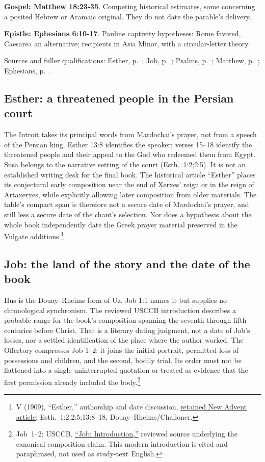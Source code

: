 \noindent\textbf{Gospel: Matthew 18:23-35}. Competing historical estimates, some concerning a posited Hebrew or Aramaic original. They do not date the parable's delivery.

\noindent\textbf{Epistle: Ephesians 6:10-17}. Pauline captivity hypotheses: Rome favored, Caesarea an alternative; recipients in Asia Minor, with a circular-letter theory.


Sources and fuller qualifications: Esther, p.~\pageref{hist-esther};
Job, p.~\pageref{hist-job}; Psalms, p.~\pageref{hist-psalms};
Matthew, p.~\pageref{hist-matthew}; Ephesians, p.~\pageref{hist-ephesians}.

\subsection{Esther: a threatened people in the Persian court}
\label{hist-esther}
The Introit takes its principal words from Mardochai's prayer, not from a
speech of the Persian king. Esther 13:8 identifies the speaker; verses
15--18 identify the threatened people and their appeal to the God who
redeemed them from Egypt. Susa belongs to the narrative setting of the
court (Esth.~1:2;2:5). It is not an established writing desk for the final
book. The historical  article ``Esther''
places its conjectural early composition near the end of Xerxes' reign
or in the reign of Artaxerxes, while explicitly allowing later composition
from older materials. The table's compact span is therefore not a secure
date of Mardochai's prayer, and still less a secure date of the chant's
selection. Nor does a hypothesis about the whole book independently date
the Greek prayer material preserved in the Vulgate additions.\footnote{
 V (1909), ``Esther,'' authorship and date
discussion, \href{https://www.newadvent.org/cathen/05549a.htm}{retained New Advent article};
Esth.~1:2;2:5;13:8--18, Douay--Rheims/Challoner.}

\subsection{Job: the land of the story and the date of the book}
\label{hist-job}
Hus is the Douay--Rheims form of Uz. Job 1:1 names it but supplies no
chronological synchronism. The reviewed USCCB introduction describes a
probable range for the book's composition spanning the seventh through
fifth centuries before Christ. That is a literary dating judgment, not a
date of Job's losses, nor a settled identification of the place where the
author worked. The Offertory compresses Job 1--2: it joins the initial
portrait, permitted loss of possessions and children, and the second,
bodily trial. Its order must not be flattened into a single uninterrupted
quotation or treated as evidence that the first permission already
included the body.\footnote{Job~1--2; USCCB,
\href{https://bible.usccb.org/bible/job/0}{``Job: Introduction,''}
reviewed source underlying the canonical composition claim. This modern
introduction is cited and paraphrased, not used as study-text English.}

